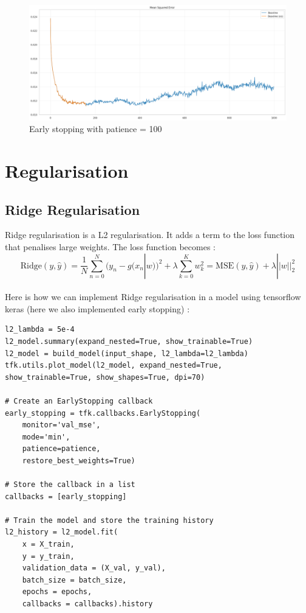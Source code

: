 \documentclass[a4paper,12pt]{article}
\begin{document}
\begin{figure}[h!]
    \centering
    \includegraphics[width=1\textwidth]{EarlyStopping.png}
    \caption{Early stopping with patience = 100}
    \label{fig:early_stopping}
\end{figure}

\section{Regularisation}
\subsection{Ridge Regularisation}

Ridge regularisation is a L2 regularisation. It adds a term to the loss function that penalises large weights. The loss function becomes :
$$\mathrm{Ridge} (y, \hat{y}) = \frac{1}{N} \sum^N_{n=0} (y_n - g(x_n|w))^2 + \lambda\sum^K_{k=0}w_k^2 = \mathrm{MSE} (y, \hat{y}) + \lambda||w||_2^2$$\\

Here is how we can implement Ridge regularisation in a model using tensorflow keras (here we also implemented early stopping) :
\begin{verbatim}
l2_lambda = 5e-4
l2_model.summary(expand_nested=True, show_trainable=True)
l2_model = build_model(input_shape, l2_lambda=l2_lambda)
tfk.utils.plot_model(l2_model, expand_nested=True, show_trainable=True, show_shapes=True, dpi=70)

# Create an EarlyStopping callback
early_stopping = tfk.callbacks.EarlyStopping(
    monitor='val_mse',
    mode='min',
    patience=patience,
    restore_best_weights=True)

# Store the callback in a list
callbacks = [early_stopping]

# Train the model and store the training history
l2_history = l2_model.fit(
    x = X_train,
    y = y_train,
    validation_data = (X_val, y_val),
    batch_size = batch_size,
    epochs = epochs,
    callbacks = callbacks).history
\end{verbatim}
\end{document}

